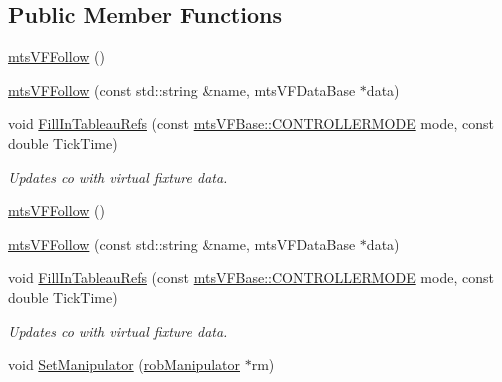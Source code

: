 \subsection*{Public Member Functions}
\begin{DoxyCompactItemize}
\item 
\hyperlink{classmts_v_f_follow_a5f15e27b89b3d7f72ae070521e6a9eb6}{mts\-V\-F\-Follow} ()
\item 
\hyperlink{classmts_v_f_follow_a0d0f799ae68cefa06cdd18dc5b1238ce}{mts\-V\-F\-Follow} (const std\-::string \&name, mts\-V\-F\-Data\-Base $\ast$data)
\item 
void \hyperlink{classmts_v_f_follow_a2fe8bc0fb58b00efe62b4d145e561989}{Fill\-In\-Tableau\-Refs} (const \hyperlink{classmts_v_f_base_a742dd08f8b70bafeb746cec14d9ee974}{mts\-V\-F\-Base\-::\-C\-O\-N\-T\-R\-O\-L\-L\-E\-R\-M\-O\-D\-E} mode, const double Tick\-Time)
\begin{DoxyCompactList}\small\item\em Updates co with virtual fixture data. \end{DoxyCompactList}\item 
\hyperlink{classmts_v_f_follow_a5f15e27b89b3d7f72ae070521e6a9eb6}{mts\-V\-F\-Follow} ()
\item 
\hyperlink{classmts_v_f_follow_a0d0f799ae68cefa06cdd18dc5b1238ce}{mts\-V\-F\-Follow} (const std\-::string \&name, mts\-V\-F\-Data\-Base $\ast$data)
\item 
void \hyperlink{classmts_v_f_follow_a2fe8bc0fb58b00efe62b4d145e561989}{Fill\-In\-Tableau\-Refs} (const \hyperlink{classmts_v_f_base_a742dd08f8b70bafeb746cec14d9ee974}{mts\-V\-F\-Base\-::\-C\-O\-N\-T\-R\-O\-L\-L\-E\-R\-M\-O\-D\-E} mode, const double Tick\-Time)
\begin{DoxyCompactList}\small\item\em Updates co with virtual fixture data. \end{DoxyCompactList}\item 
void \hyperlink{classmts_v_f_follow_aadec8c04389a7cf95447d843870b762a}{Set\-Manipulator} (\hyperlink{classrob_manipulator}{rob\-Manipulator} $\ast$rm)
\end{DoxyCompactItemize}
